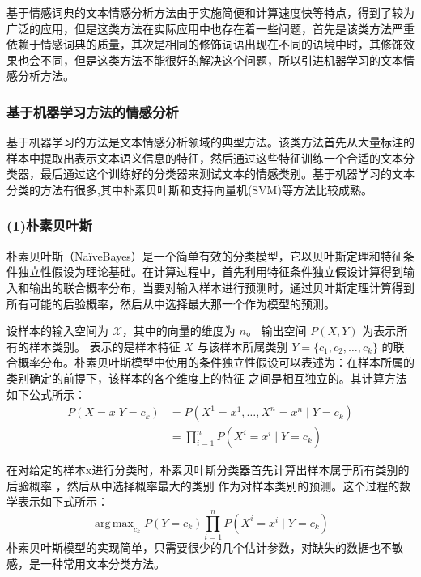 \documentclass[cs4size,a4paper]{ctexart}
\DeclareMathOperator*{\argmax}{arg\,max}
\numberwithin{equation}{section}
\numberwithin{table}{section}
\numberwithin{figure}{section}
\begin{document}
基于情感词典的文本情感分析方法由于实施简便和计算速度快等特点，得到了较为广泛的应用，但是这类方法在实际应用中也存在着一些问题，首先是该类方法严重依赖于情感词典的质量，其次是相同的修饰词语出现在不同的语境中时，其修饰效果也会不同，但是这类方法不能很好的解决这个问题，所以引进机器学习的文本情感分析方法。

\subsubsection{基于机器学习方法的情感分析}

基于机器学习的方法是文本情感分析领域的典型方法。该类方法首先从大量标注的样本中提取出表示文本语义信息的特征，然后通过这些特征训练一个合适的文本分类器，最后通过这个训练好的分类器来测试文本的情感类别。基于机器学习的文本分类的方法有很多,其中朴素贝叶斯和支持向量机(SVM)等方法比较成熟。

\subsubsection*{(1)朴素贝叶斯}

朴素贝叶斯（NaïveBayes）是一个简单有效的分类模型，它以贝叶斯定理和特征条件独立性假设为理论基础。在计算过程中，首先利用特征条件独立假设计算得到输入和输出的联合概率分布，当要对输入样本进行预测时，通过贝叶斯定理计算得到所有可能的后验概率，然后从中选择最大那一个作为模型的预测。

设样本的输入空间为 $\mathcal{X}$，其中的向量的维度为 $n$。
输出空间 $P(X,Y)$ 为表示所有的样本类别。
表示的是样本特征 $X$ 与该样本所属类别 $Y=\{c_1,c_2, \dots ,c_k\}$ 的联合概率分布。朴素贝叶斯模型中使用的条件独立性假设可以表述为：在样本所属的类别确定的前提下，该样本的各个维度上的特征 之间是相互独立的。其计算方法如下公式所示：
\begin{align}\label{eq:bayesian}
  P(X=x | Y=c_k) &= P(X^{1}=x^1,\dots,X^{n}=x^n \mid Y=c_k)\\
  &= \prod_{i=1}^{n}P(X^{i}=x^{i} \mid Y=c_k)
\end{align}

在对给定的样本x进行分类时，朴素贝叶斯分类器首先计算出样本属于所有类别的后验概率 ，然后从中选择概率最大的类别 作为对样本类别的预测。这个过程的数学表示如下式所示：
\begin{equation}\label{eq:WeightBayesian}
  \argmax_{c_k}P(Y=c_k)\prod_{i=1}^{n}P(X^{i}=x^{i} \mid Y=c_k)
\end{equation}
朴素贝叶斯模型的实现简单，只需要很少的几个估计参数，对缺失的数据也不敏感，是一种常用文本分类方法。
\end{document}

